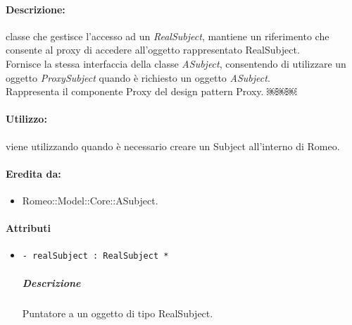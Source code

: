 	\paragraph{Descrizione:} classe che gestisce l’accesso ad un \textsl{RealSubject}, mantiene un riferimento che consente al proxy di accedere all’oggetto rappresentato RealSubject.
\\Fornisce la stessa interfaccia della classe \textsl{ASubject}, consentendo di utilizzare un oggetto \textsl{ProxySubject} quando è richiesto un oggetto \textsl{ASubject}.
\\Rappresenta il componente Proxy del design pattern\g{} Proxy.
￼￼￼
	\paragraph{Utilizzo:} viene utilizzando quando è necessario creare un Subject\g{} all'interno di Romeo\g{}.
	\paragraph{Eredita da:}
		\begin{itemize}
			\item Romeo::Model::Core::ASubject.
		\end{itemize}
	\paragraph{Attributi}
		\begin{itemize}
			\item \color{teal} \verb!- realSubject : RealSubject *!
			\color{black}
			\subparagraph{Descrizione} Puntatore a un oggetto di tipo RealSubject.
		\end{itemize}
